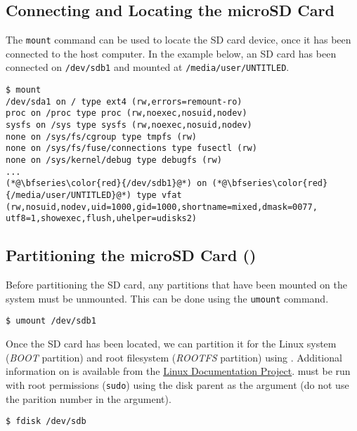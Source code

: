\subsection{Connecting and Locating the microSD Card}

The \texttt{mount} command can be used to locate the SD card device, once it has been connected to the host computer. In the example below, an SD card has been connected on \texttt{/dev/sdb1} and mounted at \texttt{/media/user/UNTITLED}.


\begin{lstlisting}[style=text]
$ mount
/dev/sda1 on / type ext4 (rw,errors=remount-ro)
proc on /proc type proc (rw,noexec,nosuid,nodev)
sysfs on /sys type sysfs (rw,noexec,nosuid,nodev)
none on /sys/fs/cgroup type tmpfs (rw)
none on /sys/fs/fuse/connections type fusectl (rw)
none on /sys/kernel/debug type debugfs (rw)
...
(*@\bfseries\color{red}{/dev/sdb1}@*) on (*@\bfseries\color{red}{/media/user/UNTITLED}@*) type vfat (rw,nosuid,nodev,uid=1000,gid=1000,shortname=mixed,dmask=0077, utf8=1,showexec,flush,uhelper=udisks2)
\end{lstlisting}


\subsection{Partitioning the microSD Card ()}
Before partitioning the SD card, any partitions that have been mounted on the system must be unmounted. This can be done using the \texttt{umount} command.


\begin{lstlisting}
$ umount /dev/sdb1
\end{lstlisting}


Once the SD card has been located, we can partition it for the Linux system (\textit{BOOT} partition) and root filesystem (\textit{ROOTFS} partition) using \href{http://linux.die.net/man/8/fdisk}{}. Additional information on  is available from the \href{http://tldp.org/HOWTO/Partition/fdisk_partitioning.html}{Linux Documentation Project}.  must be run with root permissions (\texttt{sudo}) using the disk parent as the argument (do not use the parition number in the argument). 


\begin{lstlisting}[style=text]
$ fdisk /dev/sdb
\end{lstlisting}


